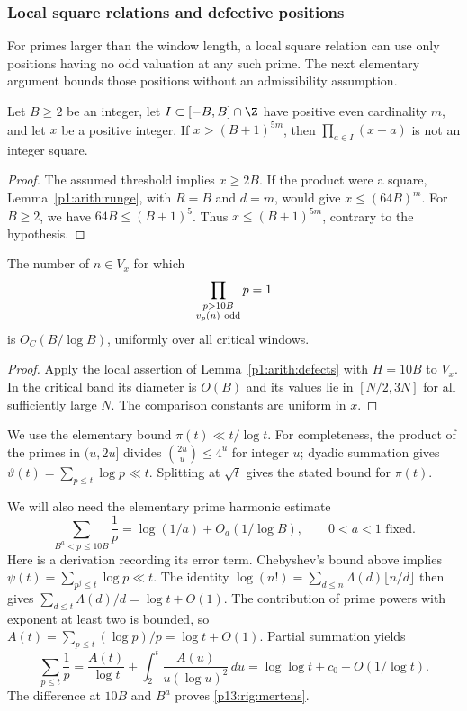 \subsubsection{Local square relations and defective positions}

For primes larger than the window length, a local square relation
can use only positions having no odd valuation at any such prime.
The next elementary argument bounds those positions without an
admissibility assumption.

\begin{lemma}
\label{p13:rig:local-square}
Let $B\ge2$ be an integer, let $I\subset[-B,B]\cap\Z$ have positive even
cardinality $m$, and let $x$ be a positive integer.  If
$x>(B+1)^{5m}$, then $\prod_{a\in I}(x+a)$ is not an integer
square.
\end{lemma}

\begin{proof}
The assumed threshold implies $x\ge2B$.
If the product were a square, Lemma~\ref{p1:arith:runge},
with $R=B$ and $d=m$, would give $x\le(64B)^m$.
For $B\ge2$, we have $64B\le(B+1)^5$.
Thus $x\le(B+1)^{5m}$,
contrary to the hypothesis.
\end{proof}

\begin{lemma}
\label{p13:rig:defective}
The number of $n\in V_x$ for which
\[
             \prod_{\substack{p>10B\\v_p(n)\ {\rm odd}}}p=1
\]
is $O_C(B/\log B)$, uniformly over all critical windows.
\end{lemma}

\begin{proof}
Apply the local assertion of Lemma~\ref{p1:arith:defects}
with $H=10B$ to $V_x$.
In the critical band its diameter is $O(B)$ and its values
lie in $[N/2,3N]$ for all sufficiently large $N$.
The comparison constants are uniform in $x$.
\end{proof}

We use the elementary bound $\pi(t)\ll t/\log t$.  For
completeness, the product of the primes in $(u,2u]$ divides
$\binom{2u}{u}\le4^u$ for integer $u$; dyadic summation gives
$\vartheta(t)=\sum_{p\le t}\log p\ll t$.  Splitting at
$\sqrt t$ gives the stated bound for $\pi(t)$.

We will also need the elementary prime harmonic estimate
\begin{equation}
 \sum_{B^a<p\le10B}\frac1p
       =\log(1/a)+O_a(1/\log B),\qquad 0<a<1\text{ fixed}.
 \label{p13:rig:mertens}
\end{equation}
Here is a derivation recording its error term.  Chebyshev's bound
above implies $\psi(t)=\sum_{p^j\le t}\log p\ll t$.
The identity
$\log(n!)=\sum_{d\le n}\Lambda(d)\lfloor n/d\rfloor$
then gives $\sum_{d\le t}\Lambda(d)/d=\log t+O(1)$.
The contribution of prime powers with exponent at least two is
bounded, so $A(t)=\sum_{p\le t}(\log p)/p=\log t+O(1)$.
Partial summation yields
\[
 \sum_{p\le t}\frac1p
 =\frac{A(t)}{\log t}+\int_2^t\frac{A(u)}{u(\log u)^2}\,du
 =\log\log t+c_0+O(1/\log t).
\]
The difference at $10B$ and $B^a$ proves
\eqref{p13:rig:mertens}.


